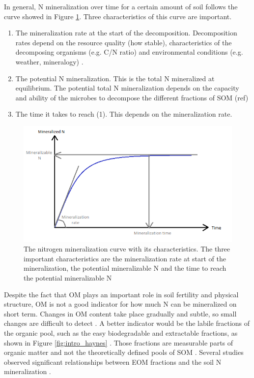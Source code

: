\documentclass[10pt,twoside,dutch,english]{report}
\begin{document}
In general, N mineralization over time for a certain amount of soil  follows the curve showed in Figure \ref{fig:intro_Ncum}. Three characteristics of this curve are important. 
\begin{enumerate}
	\item The mineralization rate at the start of the decomposition. Decomposition rates depend on the resource quality (how stable), characteristics of the decomposing organisms (e.g. C/N ratio) and environmental conditions (e.g. weather, mineralogy) \citep{Lavelle1993}. 
	\item The potential N mineralization. This is the total N mineralized at equilibrium. The potential total N mineralization depends on the capacity and ability of the microbes to decompose the different fractions of SOM (ref)
	\item The time it takes to reach (1). This depends on the mineralization rate.
\end{enumerate}


\begin{figure}[h]
	\includegraphics[width=1\linewidth]{intro_Ncum}
	\caption{The nitrogen mineralization curve with its characteristics. The three important characteristics are the mineralization rate at start of the mineralization, the potential mineralizable N and the time to reach the potential mineralizable N}
	\label{fig:intro_Ncum}
\end{figure}

Despite the fact that OM plays an important role in soil fertility and physical structure, OM is not a good indicator for how much N can be mineralized on short term. Changes in OM content take place gradually and subtle, so small changes are difficult to detect \citep{Ghani2002, Hanegraaf2009}. A better indicator would be the labile fractions of the organic pool, such as the easy biodegradable and extractable fractions, as shown in Figure \ref{fig:intro_haynes} \citep{Haynes2005}. Those fractions are measurable parts of organic matter and not the theoretically defined pools of SOM \citep{Wander2004}. Several studies observed significant relationships between EOM fractions and the soil N mineralization \citep{Ros2011a,Ros2012}.  
\end{document}
